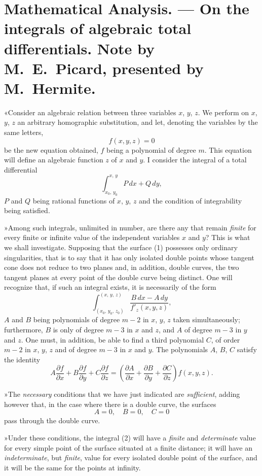 \documentclass{article}
\begin{document}
\section*{Mathematical Analysis. --- On the integrals of algebraic total differentials. Note by M.~E.~Picard, presented by M.~Hermite.}

«Consider an algebraic relation between three variables $x$, $y$, $z$. We perform on $x$, $y$, $z$ an arbitrary homographic substitution, and let, denoting the variables by the same letters,
\[
f(x, y, z) = 0
\tag{1}
\]
be the new equation obtained, $f$ being a polynomial of degree $m$. This equation will define an algebraic function $z$ of $x$ and $y$. I consider the integral of a total differential
\[
\int_{x_{0},\,y_{0}}^{x,\,y} P\,dx + Q\,dy,
\]
$P$ and $Q$ being rational functions of $x$, $y$, $z$ and the condition of integrability being satisfied.

»Among such integrals, unlimited in number, are there any that remain \emph{finite} for every finite or infinite value of the independent variables $x$ and $y$? This is what we shall investigate. Supposing that the surface (1) possesses only ordinary singularities, that is to say that it has only isolated double points whose tangent cone does not reduce to two planes and, in addition, double curves, the two tangent planes at every point of the double curve being distinct. One will recognize that, if such an integral exists, it is necessarily of the form
\[
\int_{(x_{0},\,y_{0},\,z_{0})}^{(x,\,y,\,z)} \frac{B\,dx - A\,dy}{f'_{z}(x, y, z)},
\tag{2}
\]
$A$ and $B$ being polynomials of degree $m - 2$ in $x$, $y$, $z$ taken simultaneously; furthermore, $B$ is only of degree $m - 3$ in $x$ and $z$, and $A$ of degree $m - 3$
in $y$ and $z$. One must, in addition, be able to find a third polynomial $C$, of order $m - 2$ in $x$, $y$, $z$ and of degree $m - 3$ in $x$ and $y$. The polynomials $A$, $B$, $C$ satisfy the identity
\[
A \frac{\partial f}{\partial x} + B \frac{\partial f}{\partial y} + C \frac{\partial f}{\partial z} = \left(\frac{\partial A}{\partial x} + \frac{\partial B}{\partial y} + \frac{\partial C}{\partial z}\right) f(x, y, z).
\tag{3}
\]

»The \emph{necessary} conditions that we have just indicated are \emph{sufficient}, adding however that, in the case where there is a double curve, the surfaces
\[
A = 0, \quad B = 0, \quad C = 0
\]
pass through the double curve.

»Under these conditions, the integral (2) will have a \emph{finite} and \emph{determinate} value for every simple point of the surface situated at a finite distance; it will have an \emph{indeterminate}, but \emph{finite}, value for every isolated double point of the surface, and it will be the same for the points at infinity.
\end{document}
